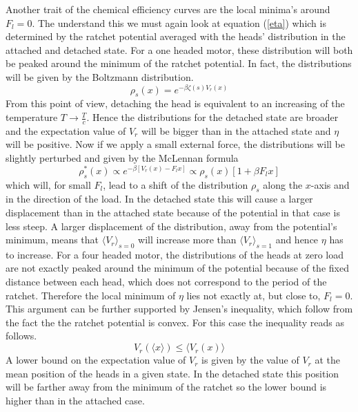 \documentclass[aps,pre,twocolumn,showpacs,showkeys,a4paper]{revtex4}
\begin{document}
Another trait of the chemical efficiency curves are the local minima's around $F_l=0$. 
The understand this we must again look at equation (\ref{eta}) which is determined by the ratchet potential averaged with the heads' distribution in the attached and detached state. 
For a one headed motor, these distribution will both be peaked around the minimum of the ratchet potential. 
In fact, the distributions will be given by the Boltzmann distribution.
\begin{equation}
\rho_s (x) = e^{-\beta \zeta(s) V_r(x)}
\end{equation} 
From this point of view, detaching the head is equivalent to an increasing of the temperature $T\rightarrow\frac{T}{c}$. 
Hence the distributions for the detached state are broader and the expectation value of $V_r$ will be bigger than in the attached state and $\eta$ will be positive. 
Now if we apply a small external force, the distributions will be slightly perturbed and given by the McLennan formula
\begin{equation}
\rho_s^*(x) \propto e^{-\beta \left[V_r(x) - F_l x\right]}\propto \rho_s(x)\left[1 + \beta F_l x\right]
\end{equation}
which will, for small $F_l$, lead to a shift of the distribution $\rho_s$ along the $x$-axis and in the direction of the load. 
In the detached state this will cause a larger displacement than in the attached state because of the potential in that case is less steep. 
A larger displacement of the distribution, away from the potential's minimum, means that $\langle V_r \rangle_{s=0}$ will increase more than $\langle V_r \rangle_{s=1}$ and hence $\eta$ has to increase. 
For a four headed motor, the distributions of the heads at zero load are not exactly peaked around the minimum of the potential because of the fixed distance between each head,  which does not correspond to the period of the ratchet. 
Therefore the local minimum of $\eta$ lies not exactly at, but close to, $F_l =0$.
This argument can be further supported by Jensen's inequality, which follow from the fact the the ratchet potential is convex. For this case the inequality reads as follows.
\begin{equation}
V_r(\langle x \rangle) \leq \langle V_r(x) \rangle
\end{equation} 
A lower bound on the expectation value of $V_r$ is given by the value of $V_r$ at the mean position of the heads in a given state. 
In the detached state this position will be farther away from the minimum of the ratchet so the lower bound is higher than in the attached case.
\end{document}
